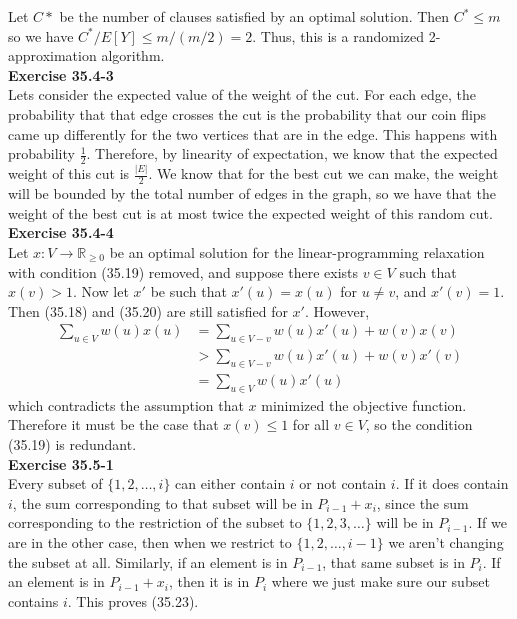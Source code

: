 \documentclass{article}
\begin{document}
Let $C*$ be the number of clauses satisfied by an optimal solution.  Then $C^* \leq m$ so we have $C^*/ E[Y] \leq m/(m/2) = 2$. Thus, this is a randomized 2-approximation algorithm. \\

\noindent\textbf{Exercise 35.4-3}\\

Lets consider the expected value of the weight of the cut. For each edge, the probability that that edge crosses the cut is the probability that our coin flips came up differently for the two vertices that are in the edge. This happens with probability $\frac{1}{2}$. Therefore, by linearity of expectation, we know that the expected weight of this cut is $\frac{|E|}{2}$. We know that for the best cut we can make, the weight will be bounded by the total number of edges in the graph, so we have that the weight of the best cut is at most twice the expected weight of this random cut.\\

\noindent\textbf{Exercise 35.4-4}\\

Let $x: V \to \mathbb{R}_{\geq 0}$ be an optimal solution for the linear-programming relaxation with condition (35.19) removed, and suppose there exists $v \in V$ such that $x(v) > 1$.  Now let $x'$ be such that $x'(u) = x(u)$ for $u \neq v$, and $x'(v) = 1$.  Then (35.18) and (35.20) are still satisfied for $x'$.  However, 
\begin{align*}
\sum_{u \in V} w(u)x(u) &= \sum_{u \in V-v} w(u)x'(u) + w(v)x(v) \\
&> \sum_{u \in V-v} w(u)x'(u) + w(v)x'(v) \\
&= \sum_{u \in V} w(u) x'(u) 
\end{align*}
which contradicts the assumption that $x$ minimized the objective function.  Therefore it must be the case that $x(v) \leq 1$ for all $v \in V$, so the condition (35.19) is redundant. \\

\noindent\textbf{Exercise 35.5-1}\\

Every subset of $\{1,2,\ldots, i\}$ can either contain $i$ or not contain $i$. If it does contain $i$, the sum corresponding to that subset will be in $P_{i-1} +x_i$, since the sum corresponding to the restriction of the subset to $\{1,2,3,\ldots\}$ will be in $P_{i-1}$. If we are in the other case, then when we restrict to $\{1,2,\ldots, i-1\}$ we aren't changing the subset at all. Similarly, if an element is in $P_{i-1}$, that same subset is in $P_i$. If an element is in $P_{i-1}+x_i$, then it is in $P_i$ where we just make sure our subset contains $i$. This proves (35.23).
\end{document}
